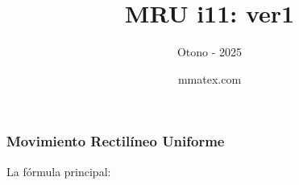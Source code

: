 \documentclass{beamer}
\title{MRU i11: ver1}
\subtitle{Otono - 2025}
\author{mmatex.com}
\begin{document}
\maketitle



\begin{frame}
\frametitle{Movimiento Rectil\'ineo Uniforme}
% 
 La f\'ormula principal:

                                                               
 
{\huge \vmru}
\vNUa
                                                               
                                                               
                                                               
                                                               
\end{frame}
\end{document}
